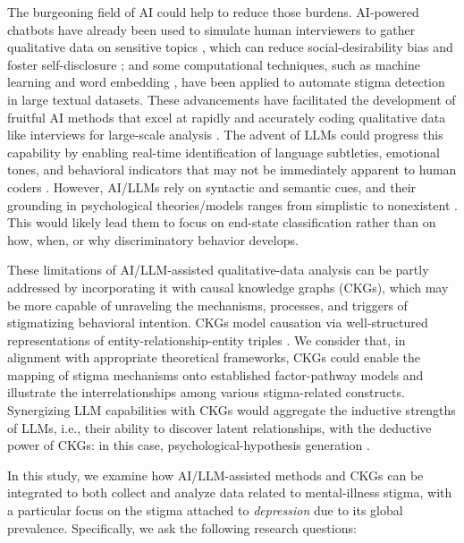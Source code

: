 The burgeoning field of AI could help to reduce those burdens. 
AI-powered chatbots have already been used to simulate human interviewers to gather qualitative data on sensitive topics \cite{chatbot_reduce_kim_2020, chatbot_reduce_sebastian_2017}, which can reduce social-desirability bias and foster self-disclosure \cite{chatbot_disclosure_lucas_2014}; and some computational techniques, such as machine learning \cite{detect_method_jilka_2022} and word embedding \cite{detect_method_mittal_2023}, have been applied to automate stigma detection in large textual datasets. 
These advancements have facilitated the development of fruitful AI methods that excel at rapidly and accurately coding qualitative data like interviews for large-scale analysis \cite{ai_qualitative_feuston_2021}. 
The advent of LLMs could progress this capability by enabling real-time identification of language subtleties, emotional tones, and behavioral indicators that may not be immediately apparent to human coders \cite{coding_deductive_llm_tai_2024}.
However, AI/LLMs rely on syntactic and semantic cues, and their grounding in psychological theories/models ranges from simplistic to nonexistent \cite{theory_nlp_boyd_2021}. 
This would likely lead them to focus on end-state classification rather than on how, when, or why discriminatory behavior develops.


These limitations of AI/LLM-assisted qualitative-data analysis can be partly addressed by incorporating it with causal knowledge graphs (CKGs), which may be more capable of unraveling the mechanisms, processes, and triggers of stigmatizing behavioral intention. 
CKGs model causation via well-structured representations of entity-relationship-entity triples \cite{causal_graph_overview_jaimini_2022}. 
We consider that, in alignment with appropriate theoretical frameworks, CKGs could enable the mapping of stigma mechanisms onto established factor-pathway models and illustrate the interrelationships among various stigma-related constructs. 
Synergizing LLM capabilities with CKGs would aggregate the inductive strengths of LLMs, i.e., their ability to discover latent relationships, with the deductive power of CKGs: in this case, psychological-hypothesis generation \cite{ckg_llm_tong_2024}.

In this study, we examine how AI/LLM-assisted methods and CKGs can be integrated to both collect and analyze data related to mental-illness stigma, with a particular focus on the stigma attached to \textit{depression} due to its global prevalence. Specifically, we ask the following research questions: 

